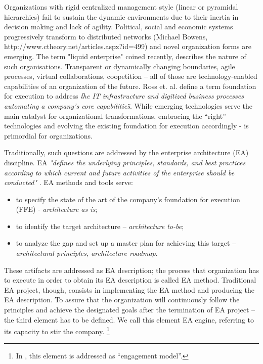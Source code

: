  Organizations with rigid centralized management style (linear or pyramidal hierarchies) fail to sustain the dynamic environments due to their inertia in decision making and lack of agility. Political, social and economic systems progressively transform to distributed networks (Michael Bowens, http://www.ctheory.net/articles.aspx?id=499) and novel organization forms are emerging. 
The term "liquid enterprise" coined recently, describes the nature of such organisations. Transparent or dynamically changing boundaries, agile processes\cite{agileproc}, virtual collaborations, coopetition \cite{coopetition} – all of those are technology-enabled capabilities of an organization of the future. 
Ross et. al. \cite{ross2006} define a term foundation for execution to address \textit{\"the IT infrastructure and digitized business processes automating a company’s core capabilities\"}. While emerging technologies serve the main catalyst for organizational transformations, embracing the “right” technologies and evolving the existing foundation for execution accordingly - is primordial for organizations. 

Traditionally, such questions are addressed by the enterprise architecture (EA) discipline. EA \textit{"defines the underlying principles, standards, and best practices according to which current and future activities of the enterprise should be conducted"} \cite{schekkerman2003}. EA methods and tools serve:
\begin{itemize}
\item to specify the state of the art of the company’s foundation for execution (FFE)  - \textit{architecture as is};
\item to identify the target architecture – \textit{architecture to-be};
\item to analyze the gap and set up a master plan for achieving this target – \textit{architectural principles, architecture roadmap}.
\end{itemize}
These artifacts are addressed as EA description; the process that organization has to execute in order to obtain its EA description is called EA method. Traditional EA project, though, consists in implementing the EA method and producing the EA description. To assure that the organization will continuously follow the principles and achieve the designated goals after the termination of EA project – the third element has to be defined. We call this element EA engine, referring to its capacity to stir the company. \footnote{In \cite{ross2006}, this element is addressed as “engagement model”.}

